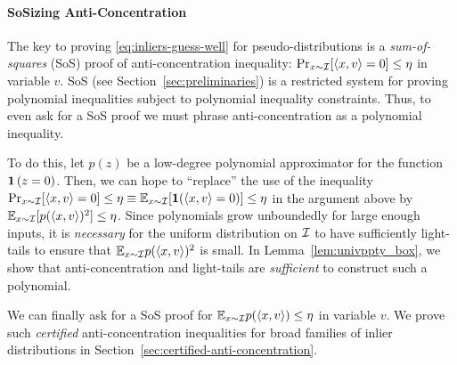 
\paragraph{SoSizing Anti-Concentration} The key to proving \eqref{eq:inliers-guess-well} for pseudo-distributions is a \emph{sum-of-squares} (SoS) proof of anti-concentration inequality: $\Pr_{x \sim \mathcal I} [\langle x,v\rangle =0] \leq \eta$ in variable $v$. SoS (see Section~\ref{sec:preliminaries}) is a restricted system for proving polynomial inequalities subject to polynomial inequality constraints. Thus, to even ask for a SoS proof we must phrase anti-concentration as a polynomial inequality. 

To do this, let $p(z)$ be a low-degree polynomial approximator for the function $\bm{1}\left( z=0\right)$. 
Then, we can hope to ``replace'' the use of the inequality $\Pr_{x \sim \mathcal I} [\langle x,v\rangle =0] \leq \eta \equiv \mathbb{E}_{x \sim \mathcal I} [\bm{1}(\langle x,v\rangle = 0)] \leq \eta$ in the argument above by $\mathbb{E}_{x \sim \mathcal I}[ p(\langle x,v\rangle)^2] \leq \eta$. Since  polynomials grow unboundedly for large enough inputs, it is \emph{necessary} for the uniform distribution on $\mathcal I$ to have sufficiently light-tails to ensure that $\mathbb{E}_{x \sim \mathcal I} p(\langle x,v\rangle)^2$ is small. In Lemma~\ref{lem:univppty_box}, we show that anti-concentration and light-tails are \emph{sufficient} to construct such a polynomial. 

We can finally ask for a SoS proof for $\mathbb{E}_{x \sim \mathcal I} p(\langle x,v\rangle) \leq \eta$ in variable $v$. We prove such \emph{certified} anti-concentration inequalities for broad families of inlier distributions in Section~\ref{sec:certified-anti-concentration}.



